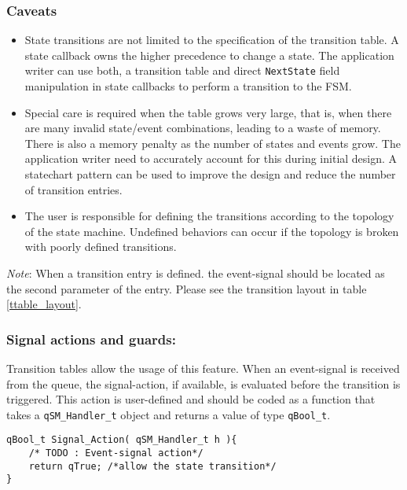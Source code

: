\subsubsection*{Caveats}
\begin{itemize}
    \item State transitions are not limited to the specification of the transition table. A state callback owns the higher precedence to change a state. The application writer can use both, a transition table and direct \lstinline{NextState} field manipulation in state callbacks to perform a transition to the FSM.
    \item Special care is required when the table grows very large, that is, when there are many invalid state/event combinations, leading to a waste of memory. There is also a memory penalty as the number of states and events grow. The application writer  need to accurately account for this during initial design. A statechart pattern can be used to improve the design and reduce the number of transition entries. 
    \item The user is responsible for defining the transitions according to the topology of the state machine. Undefined behaviors can occur if the topology is broken with poorly defined transitions.
\end{itemize}


\begin{tcolorbox}
\ArrowBoldDownRight \textit{Note}: When a transition entry is defined. the event-signal should be located as the second parameter of the entry. Please see the transition layout in table \ref{ttable_layout}.
\end{tcolorbox}

\subsubsection{Signal actions and guards:} 
Transition tables allow the usage of this feature. When an event-signal is received from the queue, the signal-action, if available, is evaluated before the transition is triggered. This action is user-defined and should be coded as a function that takes a \lstinline{qSM_Handler_t} object and returns a value of type \lstinline{qBool_t}. 
\medskip

\begin{lstlisting}[style=CStyle]
qBool_t Signal_Action( qSM_Handler_t h ){
    /* TODO : Event-signal action*/
    return qTrue; /*allow the state transition*/
}
\end{lstlisting}

